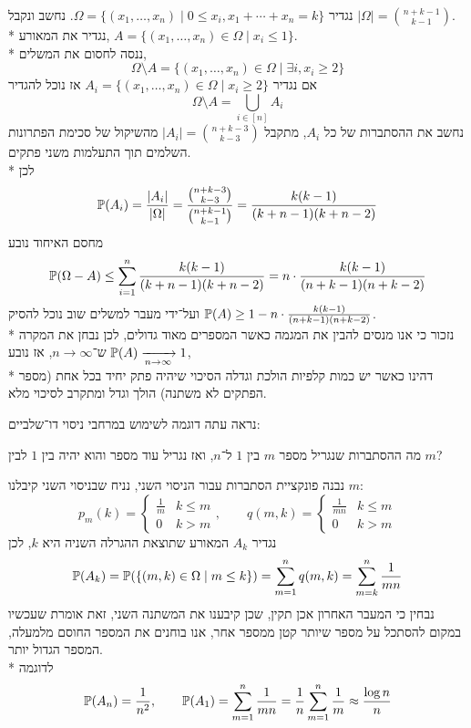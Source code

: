 \begin{solution}
	נגדיר $\Omega = \{ (x_1, \dots, x_n) \mid 0 \le x_i, x_1 + \cdots + x_n = k \}$.
	נחשב ונקבל $|\Omega| = \binom{n + k - 1}{k - 1}$. \\*
	נגדיר את המאורע, $A = \{ (x_1, \dots, x_n) \in \Omega \mid x_i \le 1 \}$. \\*
	ננסה לחסום את המשלים,
	\[
		\Omega \setminus A = \{ (x_1, \dots, x_n) \in \Omega \mid \exists i, x_i \ge 2 \}
	\]
	אם נגדיר $A_i = \{ (x_1, \dots, x_n) \in \Omega \mid x_i \ge 2 \}$ אז נוכל להגדיר
	\[
		\Omega \setminus A = \bigcup_{i \in [n]} A_i
	\]
	נחשב את ההסתברות של כל $A_i$, מתקבל $|A_i| = \binom{n + k - 3}{k - 3}$ מהשיקול של סכימת הפתרונות השלמים תוך התעלמות משני פתקים. \\*
	לכן
	\[
		\mathbb{P}(A_i) = \frac{|A_i|}{|\Omega|} = \frac{\binom{n + k - 3}{k - 3}}{\binom{n + k - 1}{k - 1}} = \frac{k(k - 1)}{(k + n - 1)(k + n - 2)}
	\]
	מחסם האיחוד נובע
	\[
		\mathbb{P}(\Omega - A) \le \sum_{i = 1}^{n} \frac{k(k - 1)}{(k + n - 1)(k + n - 2)} = n \cdot \frac{k(k  -1)}{(n + k - 1)(n + k - 2)}
	\]
	ועל־ידי מעבר למשלים שוב נוכל להסיק $\mathbb{P}(A) \ge 1 - n \cdot \frac{k(k  -1)}{(n + k - 1)(n + k - 2)}$. \\*
	נזכור כי אנו מנסים להבין את המגמה כאשר המספרים מאוד גדולים, לכן נבחן את המקרה ש־$n \to \infty$, אז נובע $\mathbb{P}(A) \xrightarrow[n \to \infty]{} 1$, \\*
	דהינו כאשר יש כמות קלפיות הולכת וגדלה הסיכוי שיהיה פתק יחיד בכל אחת (מספר הפתקים לא משתנה) הולך וגדל ומתקרב לסיכוי מלא.
\end{solution}
נראה עתה דוגמה לשימוש במרחבי ניסוי דו־שלביים:
\begin{exercise}
	מה ההסתברות שנגריל מספר $m$ בין $1$ ל־$n$,
	ואז נגריל עוד מספר והוא יהיה בין $1$ לבין $m$?
\end{exercise}
\begin{solution}
	נבנה פונקציית הסתברות עבור הניסוי השני, נניח שבניסוי השני קיבלנו $m$:
	\[
		p_m(k) = \begin{cases}
			\frac{1}{m} & k \le m \\
			0 & k > m
		\end{cases},
		\qquad
		q(m, k) = \begin{cases}
			\frac{1}{mn} & k \le m \\
			0 & k > m
		\end{cases}
	\]
	נגדיר $A_k$ המאורע שתוצאת ההגרלה השניה היא $k$, לכן
	\[
		\mathbb{P}(A_k)
		= \mathbb{P}(\{(m, k) \in \Omega \mid m \le k \})
		= \sum_{m = 1}^{n} q(m, k)
		= \sum_{m = k}^{n} \frac{1}{mn}
	\]
	נבחין כי המעבר האחרון אכן תקין, שכן קיבענו את המשתנה השני, זאת אומרת שעכשיו במקום להסתכל על מספר שיותר קטן ממספר אחר, אנו בוחנים את המספר החוסם מלמעלה, המספר הגדול יותר. \\*
	לדוגמה
	\[
		\mathbb{P}(A_n) = \frac{1}{n^2},
		\qquad
		\mathbb{P}(A_1) = \sum_{m = 1}^{n} \frac{1}{mn} = \frac{1}{n} \sum_{m = 1}^n \frac{1}{m} \approx \frac{\log n}{n}
	\]
\end{solution}
